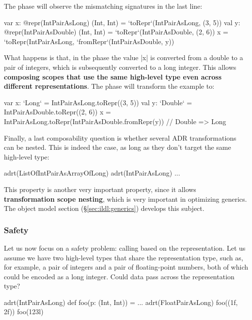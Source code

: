 The \coerce{} phase will observe the mismatching signatures in the last line:

\begin{lstlisting-nobreak}
var x: @repr(IntPairAsLong) (Int, Int) = `toRepr`(IntPairAsLong, (3, 5))
val y: @repr(IntPairAsDouble) (Int, Int) = `toRepr`(IntPairAsDouble, (2, 6))
x = `toRepr(IntPairAsLong, `fromRepr`(IntPairAsDouble, y))
\end{lstlisting-nobreak}

What happens is that, in the \coerce{} phase the value |x| is converted from a double to a pair of integers, which is subsequently converted to a long integer. This allows \textbf{composing scopes that use the same high-level type even across different representations}. The \commit{} phase will transform the example to:

\begin{lstlisting-nobreak}
var x: `Long` = IntPairAsLong.toRepr((3, 5))
val y: `Double` = IntPairAsDouble.toRepr((2, 6))
x = IntPairAsLong.toRepr(IntPairAsDouble.fromRepr(y)) // Double => Long
\end{lstlisting-nobreak}

Finally, a last composability question is whether several ADR transformations can be nested. This is indeed the case, as long as they don't target the same high-level type:

\begin{lstlisting-nobreak}
adrt(ListOfIntPairAsArrayOfLong) {
  adrt(IntPairAsLong) {
    ...
  }
}
\end{lstlisting-nobreak}

This property is another very important property, since it allows \textbf{transformation scope nesting}, which is very important in optimizing generics. The object model section (\S\ref{sec:ildl:generics}) develops this subject.

\subsubsection{Safety}

Let us now focus on a safety problem: calling based on the representation. Let us assume we have two high-level types that share the representation type, such as, for example, a pair of integers and a pair of floating-point numbers, both of which could be encoded as a long integer. Could data pass across the representation type?

\begin{lstlisting-nobreak}
adrt(IntPairAsLong) { def foo(p: (Int, Int)) = ... }
adrt(FloatPairAsLong) { foo((1f, 2f)) }
foo(123l)
\end{lstlisting-nobreak}

